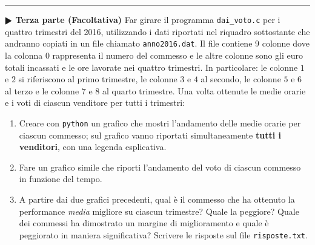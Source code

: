 \documentclass[11pt]{article}
\begin{document}
\hrule
\vspace{2mm}
\textbf{$\RHD$ Terza parte (Facoltativa)}
Far girare il programma \texttt{dai\_voto.c} per i quattro trimestri del 2016, utilizzando i dati riportati nel riquadro sottostante che andranno copiati in un file chiamato \texttt{anno2016.dat}. 
Il file contiene 9 colonne dove la colonna $0$ rappresenta il numero del commesso e le altre colonne sono gli euro totali incassati e le ore lavorate nei quattro trimestri. In particolare: le colonne $1$ e $2$ si riferiscono al primo trimestre, le colonne $3$ e $4$ al secondo, le colonne $5$ e $6$ al terzo e le colonne $7$ e $8$ al quarto trimestre.
Una volta ottenute le medie orarie e i voti di ciascun venditore per tutti i trimestri:
\begin{enumerate}
\item Creare con \texttt{python} un grafico che mostri l'andamento delle medie orarie per ciascun commesso; sul grafico vanno riportati simultaneamente {\bf tutti i venditori}, con una legenda esplicativa.
\item Fare un grafico simile che riporti l'andamento del voto di ciascun commesso in funzione del tempo.
\item A partire dai due grafici precedenti, qual \`{e} il commesso che ha ottenuto la performance {\em media\/} migliore su ciascun trimestre? Quale la peggiore?
Quale dei commessi ha dimostrato un margine di miglioramento e quale \`e peggiorato in maniera significativa?
Scrivere le risposte sul file \texttt{risposte.txt}.
\end{enumerate}
\end{document}
